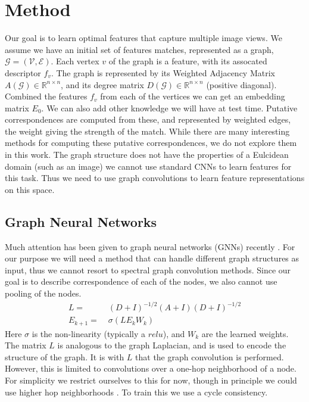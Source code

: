 \documentclass[10pt,twocolumn,letterpaper]{article}
\newcommand{\bR}{\mathbb{R}}
\begin{document}
\section{Method}
Our goal is to learn optimal features that capture multiple image views.
We assume we have an initial set of features matches, represented as a graph, $\mathcal{G} = (\mathcal{V}, \mathcal{E})$.
Each vertex $v$ of the graph is a feature, with its assocated descriptor $f_v$. 
The graph is represented by its Weighted Adjacency Matrix $A(\mathcal{G}) \in \bR^{n \times n}$, and its degree matrix $D(\mathcal{G}) \in \bR^{n \times n}$ (positive diagonal).
Combined the features $f_v$ from each of the vertices we can get an embedding matrix $E_0$.
We can also add other knowledge we will have at test time.
Putative correspondences are computed from these, and represented by weighted edges, the weight giving the strength of the match.
While there are many interesting methods for computing these putative correspondences, we do not explore them in this work.
The graph structure does not have the properties of a Eulcidean domain (such as an image) we cannot use standard CNNs to learn features for this task.
Thus we need to use graph convolutions to learn feature representations on this space.

\subsection{Graph Neural Networks}
Much attention has been given to graph neural networks (GNNs) recently
\cite{bronstein2017geometric, bruna2013spectral, defferrard2016convolutional, kipf2016semi, scarselli2009graph, gama2018mimo, gama2018convolutional}.
For our purpose we will need a method that can handle different graph structures as input, thus we cannot resort to spectral graph convolution methods.
Since our goal is to describe correspondence of each of the nodes, we also cannot use pooling of the nodes.
\begin{align}
      L =&\; (D + I)^{-1/2} (A + I) (D + I)^{-1/2} \\
E_{k+1} =&\; \sigma\left(L E_k W_k \right)
\end{align}
Here $\sigma$ is the non-linearity (typically a $relu$), and $W_k$ are the learned weights. 
The matrix $L$ is analogous to the graph Laplacian, and is used to encode the structure of the graph.
It is with $L$ that the graph convolution is performed.
However, this is limited to convolutions over a one-hop neighborhood of a node.
For simplicity we restrict ourselves to this for now, though in principle we could use higher hop neighborhoods \cite{gama2018convolutional}.
To train this we use a cycle consistency.
\end{document}

